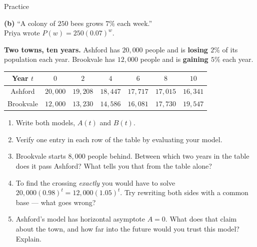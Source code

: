 \documentclass[10pt]{article}
\begin{document}
\begin{notesbox}{Practice}
\begin{enumerate}[leftmargin=1.9em, itemsep=12pt]
    \textbf{(b)} ``A colony of $250$ bees grows $7\%$ each week.'' \\
    \hspace*{1.2em} Priya wrote $P(w) = 250(0.07)^{w}$.
\end{enumerate}
\end{notesbox}

\begin{extensionbox}
\textbf{Two towns, ten years.} Ashford has $20{,}000$ people and is \textbf{losing $2\%$} of its
population each year. Brookvale has $12{,}000$ people and is \textbf{gaining $5\%$} each year.
\begin{center}
\renewcommand{\arraystretch}{1.25}
\begin{tabular}{|c|c|c|c|c|c|c|}
\hline
Year $t$ & $0$ & $2$ & $4$ & $6$ & $8$ & $10$ \\ \hline
Ashford & $20{,}000$ & $19{,}208$ & $18{,}447$ & $17{,}717$ & $17{,}015$ & $16{,}341$ \\ \hline
Brookvale & $12{,}000$ & $13{,}230$ & $14{,}586$ & $16{,}081$ & $17{,}730$ & $19{,}547$ \\ \hline
\end{tabular}
\end{center}
\begin{enumerate}[label=(\alph*), leftmargin=1.8em, itemsep=5pt]
  \item Write both models, $A(t)$ and $B(t)$.
  \item Verify one entry in each row of the table by evaluating your model.
  \item Brookvale starts $8{,}000$ people behind. Between which two years in the table does it pass
        Ashford? What tells you that from the table alone?
  \item To find the crossing \emph{exactly} you would have to solve
        $20{,}000(0.98)^{t} = 12{,}000(1.05)^{t}$. Try rewriting both sides with a common base ---
        what goes wrong?
  \item Ashford's model has horizontal asymptote $A=0$. What does that claim about the town, and how
        far into the future would you trust this model? Explain.
\end{enumerate}

\end{extensionbox}
\end{document}
